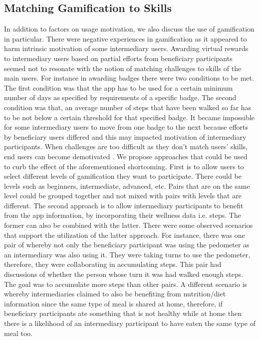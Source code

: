 \documentclass{sig-alternate}
\begin{document}
\subsection{Matching Gamification to Skills}
In addition to factors on usage motivation, we also discuss the use of gamification in particular. There were negative experiences in  gamification as it  appeared to harm intrinsic motivation of some intermediary users. Awarding virtual rewards to intermediary users based on partial efforts from beneficiary participants seemed not to resonate with the notion of matching challenges to skills of the main users. For instance in awarding badges there were two conditions to be met. The first condition was that the app has to be used for a certain minimum number of days as specified by requirements of a specific badge. The second condition was that, an average number of steps that have been walked so far has to be not below a certain threshold for that specified badge. It became impossible for some intermediary users to move from one badge to the next because efforts by beneficiary users differed and this may impacted motivation of intermediary participants. When challenges are too difficult as they don't match users' skills, end users can become demotivated \cite{zhang2008:motivational}.\newline 
We propose approaches that could be used to curb the effect of the  aforementioned shortcoming. First is to allow users to select different levels of gamification they want to participate. There could be levels such as beginners, intermediate, advanced, etc. Pairs that are on the same level could be grouped together and not mixed with pairs with levels that are different. The second approach is to allow intermediary participants to benefit from the app information, by incorporating their wellness data i.e. steps. The former can also be combined with the latter. There were some observed scenarios that support the utilization of the latter approach. For instance, there was one pair of whereby not only the beneficiary participant was using the pedometer as an intermediary was also using it. They were taking turns to use the pedometer, therefore, they were collaborating in accumulating steps. This pair had discussions of whether the person whose turn it was had walked enough steps. The goal was to accumulate more steps than other pairs. A different scenario is whereby intermediaries claimed to also be benefiting from nutrition/diet information since the same type of meal is shared at home, therefore, if beneficiary participants ate something that is not healthy while at home then there is a likelihood of an intermediary participant to have eaten the same type of meal too.
\end{document}

